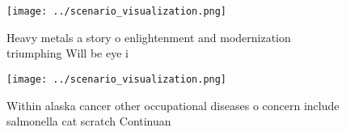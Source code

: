 \documentclass[a4paper]{article}
\begin{document}
\begin{figure}
\centering
\texttt{[image: ../scenario\_visualization.png]}
\caption{Heavy metals a story o enlightenment and modernization triumphing Will be eye i
}
\end{figure}
 
\begin{figure}
\centering
\texttt{[image: ../scenario\_visualization.png]}
\caption{Within alaska cancer other occupational diseases o concern include salmonella cat scratch Continuan
}
\end{figure}
 
\end{document}
